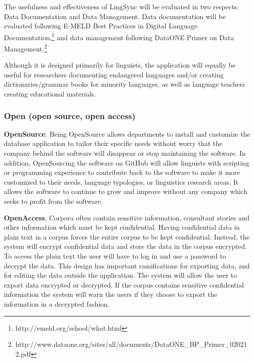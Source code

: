 \documentclass[letterpaper, 12pt, dvips]{mitwpl}
\begin{document}
The usefulness and effectiveness of LingSync will be evaluated in two respects: Data Documentation and Data Management. Data documentation will be evaluated following E-MELD Best Practices in Digital Language Documentation,\footnote{http://emeld.org/school/what.html} and data management following DataONE Primer on Data Management.\footnote{http://www.dataone.org/sites/all/documents/DataONE\_BP\_Primer\_020212.pdf}





Although it is designed primarily for linguists, the application will equally be useful for researchers documenting endangered languages and/or creating dictionaries/grammar books for minority languages, as well as language teachers creating educational materials.  


\subsubsection{Open (open source, open access)}


\begin{description}

\item { \bf OpenSource}. Being OpenSource allows departments to install and customize the database application to tailor their specific needs without worry that the company behind the software will disappear or stop maintaining the software. In addition, OpenSourcing the software on GitHub will allow linguists with scripting or programming experience to contribute back to the software to make it more customized to their needs, language typologies, or linguistics research areas. It allows the software to continue to grow and improve without any company which seeks to profit from the software.
 

\item {\bf OpenAccess}. Corpora often contain sensitive information, consultant stories and other information which must be kept confidential. Having confidential data in plain text in a corpus forces the entire corpus to be kept confidential. Instead, the system will encrypt confidential data and store the data in the corpus encrypted. To access the plain text the user will have to log in and use a password to decrypt the data. This design has important ramifications for exporting data, and for editing the data outside the application. The system will allow the user to export data encrypted or decrypted. If the corpus contains sensitive confidential information the system will warn the users if they choose to export the information in a decrypted fashion.


\end{description}
\end{document}
